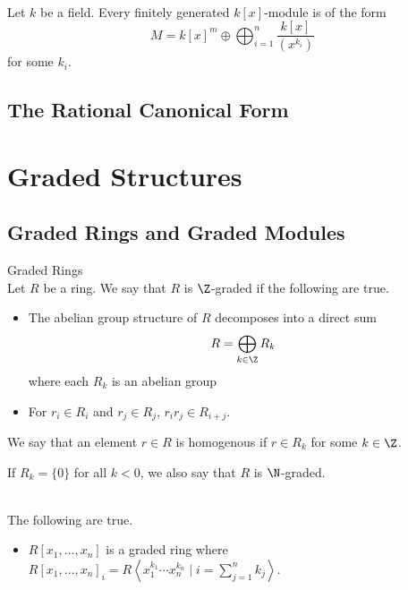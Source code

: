 \documentclass[a4paper]{article}
\begin{document}
\begin{eg}{}{}\\
Let $k$ be a field. Every finitely generated $k[x]$-module is of the form $$M=k[x]^m\oplus\bigoplus_{i=1}^n\frac{k[x]}{(x^{k_i})}$$ for some $k_i$. 
\end{eg}

\subsection{The Rational Canonical Form}

\pagebreak
\section{Graded Structures}
\subsection{Graded Rings and Graded Modules}
\begin{defn}{Graded Rings}{}\\
Let $R$ be a ring. We say that $R$ is $\Z$-graded if the following are true. 
\begin{itemize}
\item The abelian group structure of $R$ decomposes into a direct sum $$R=\bigoplus_{k\in\Z} R_k$$ where each $R_k$ is an abelian group 
\item For $r_i\in R_i$ and $r_j\in R_j$, $r_ir_j\in R_{i+j}$. 
\end{itemize}
We say that an element $r\in R$ is homogenous if $r\in R_k$ for some $k\in\Z$. 
\end{defn}

If $R_k=\{0\}$ for all $k<0$, we also say that $R$ is $\N$-graded. 

\begin{eg}{}{}\\
The following are true. 
\begin{itemize}
\item $R[x_1,\dots,x_n]$ is a graded ring where $R[x_1,\dots,x_n]_i =R\left\langle x_1^{k_1}\cdots x_n^{k_n}\;|\;i=\sum_{j=1}^nk_j\right\rangle$. 
\end{itemize}
\end{eg}
\end{document}
